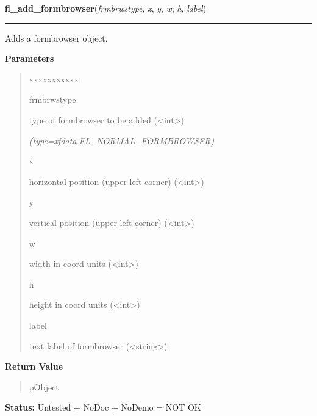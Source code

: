\hspace{.8\funcindent}\begin{boxedminipage}{\funcwidth}

    \raggedright \textbf{fl\_add\_formbrowser}(\textit{frmbrwstype}, \textit{x}, \textit{y}, \textit{w}, \textit{h}, \textit{label})

    \vspace{-1.5ex}

    \rule{\textwidth}{0.5\fboxrule}
\setlength{\parskip}{2ex}
    Adds a formbrowser object.

\setlength{\parskip}{1ex}
      \textbf{Parameters}
      \vspace{-1ex}

      \begin{quote}
        \begin{Ventry}{xxxxxxxxxxx}

          \item[frmbrwstype]

          type of formbrowser to be added ({\textless}int{\textgreater})

            {\it (type=xfdata.FL\_NORMAL\_FORMBROWSER)}

          \item[x]

          horizontal position (upper-left corner) 
          ({\textless}int{\textgreater})

          \item[y]

          vertical position (upper-left corner) 
          ({\textless}int{\textgreater})

          \item[w]

          width in coord units ({\textless}int{\textgreater})

          \item[h]

          height in coord units ({\textless}int{\textgreater})

          \item[label]

          text label of formbrowser ({\textless}string{\textgreater})

        \end{Ventry}

      \end{quote}

      \textbf{Return Value}
    \vspace{-1ex}

      \begin{quote}
      pObject

      \end{quote}

\textbf{Status:} Untested + NoDoc + NoDemo = NOT OK



    \end{boxedminipage}

